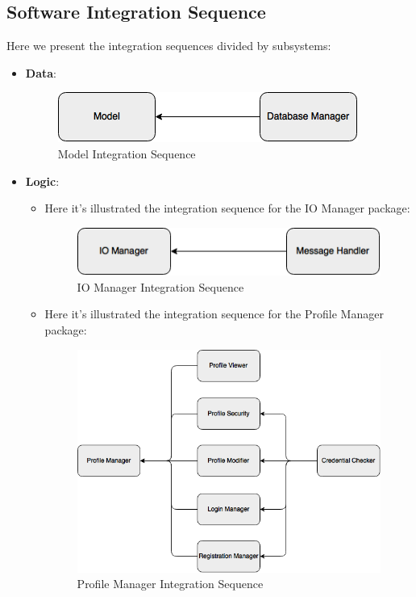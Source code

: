 \documentclass[../../../../../../testPlan.tex]{subfiles}
\begin{document}
	\subsection{Software Integration Sequence}
		Here we present the integration sequences divided by subsystems:
		\begin{itemize}
			\item \textbf{Data}:
					\begin{figure}[H]
						\centering
						\includegraphics[width=\textwidth, scale=0.5]{../images/priority_model.png}
						\caption{Model Integration Sequence}\label{fig:ModelSequence}
					\end{figure}

			\item \textbf{Logic}:
					\begin{itemize}
						\item Here it's illustrated the integration sequence for the IO Manager package:
							\begin{figure}[H]
								\centering
								\includegraphics[width=\textwidth, scale=0.5]{../images/priority_ioManager.png}
							\caption{IO Manager Integration Sequence}\label{fig:IOManagerSequence}
							\end{figure}

						\item Here it's illustrated the integration sequence for the Profile Manager package:
							\begin{figure}[H]
								\centering
								\includegraphics[width=\textwidth, scale=0.5]{../images/priority_profileManager.png}
							\caption{Profile Manager Integration Sequence}\label{fig:ProfileManagerSequence}
							\end{figure}


\end{itemize}
\end{itemize}
\end{document}
